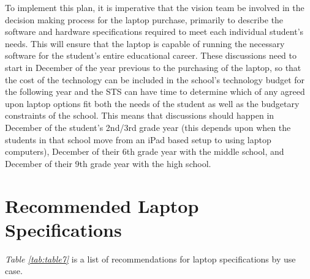 To implement this plan, it is imperative that the vision team be involved in the decision making process for the laptop purchase, primarily to describe the software and hardware specifications required to meet each individual student's needs. This will ensure that the laptop is capable of running the necessary software for the student's entire educational career. These discussions need to start in December of the year previous to the purchasing of the laptop, so that the cost of the technology can be included in the school's technology budget for the following year and the STS can have time to determine which of any agreed upon laptop options fit both the needs of the student as well as the budgetary constraints of the school. This means that discussions should happen in December of the student's 2nd/3rd grade year (this depends upon when the students in that school move from an iPad based setup to using laptop computers), December of their 6th grade year with the middle school, and December of their 9th grade year with the high school.

\pagebreak
\hypertarget{minimum-laptop-recommendations}{}\section{Recommended Laptop Specifications}\label{minimum-laptop-recommendations}
\textit{Table \ref{tab:table7}} is a list of recommendations for laptop specifications by use case.

